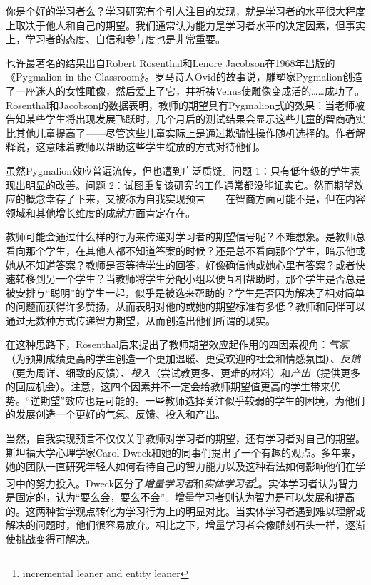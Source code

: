 你是个好的学习者么？学习研究有个引人注目的发现，就是学习者的水平很大程度上取决于他人和自己的期望。我们通常认为能力是学习者水平的决定因素，但事实上，学习者的态度、自信和参与度也是非常重要。

也许最著名的结果出自Robert Rosenthal和Lenore Jacobson在1968年出版的《Pygmalion in the Classroom》。罗马诗人Ovid的故事说，雕塑家Pygmalion创造了一座迷人的女性雕像，然后爱上了它，并祈祷Venus使雕像变成活的……成功了。Rosenthal和Jacobson的数据表明，教师的期望具有Pygmalion式的效果：当老师被告知某些学生将出现发展飞跃时，几个月后的测试结果会显示这些儿童的智商确实比其他儿童提高了——尽管这些儿童实际上是通过欺骗性操作随机选择的。作者解释说，这意味着教师以帮助这些学生绽放的方式对待他们。

虽然Pygmalion效应普遍流传，但也遭到广泛质疑。问题 1：只有低年级的学生表现出明显的改善。问题 2：试图重复该研究的工作通常都没能证实它。然而期望效应的概念幸存了下来，又被称为自我实现预言——在智商方面可能不是，但在内容领域和其他增长维度的成就方面肯定存在。

教师可能会通过什么样的行为来传递对学习者的期望信号呢？不难想象。是教师总看向那个学生，在其他人都不知道答案的时候？还是总不看向那个学生，暗示他或她从不知道答案？教师是否等待学生的回答，好像确信他或她心里有答案？或者快速转移到另一个学生？当教师将学生分配小组以便互相帮助时，那个学生是否总是被安排与“聪明”的学生一起，似乎是被选来帮助的？学生是否因为解决了相对简单的问题而获得许多赞扬，从而表明对他的或她的期望标准有多低？教师和同伴可以通过无数种方式传递智力期望，从而创造出他们所谓的现实。

在这种思路下，Rosenthal后来提出了教师期望效应起作用的四因素视角：\textit{气氛}（为预期成绩更高的学生创造一个更加温暖、更受欢迎的社会和情感氛围）、\textit{反馈}（更为周详、细致的反馈）、\textit{投入}（尝试教更多、更难的材料）和\textit{产出}（提供更多的回应机会）。注意，这四个因素并不一定会给教师期望值更高的学生带来优势。“逆期望”效应也是可能的。一些教师选择关注似乎较弱的学生的困境，为他们的发展创造一个更好的气氛、反馈、投入和产出。

当然，自我实现预言不仅仅关乎教师对学习者的期望，还有学习者对自己的期望。斯坦福大学心理学家Carol Dweck和她的同事们提出了一个有趣的观点。多年来，她的团队一直研究年轻人如何看待自己的智力能力以及这种看法如何影响他们在学习中的努力投入。Dweck区分了\textit{增量学习者}和\textit{实体学习者}\footnote{incremental leaner and entity leaner}。实体学习者认为智力是固定的，认为“要么会，要么不会”。增量学习者则认为智力是可以发展和提高的。这两种哲学观点转化为学习行为上的明显对比。当实体学习者遇到难以理解或解决的问题时，他们很容易放弃。相比之下，增量学习者会像雕刻石头一样，逐渐使挑战变得可解决。

